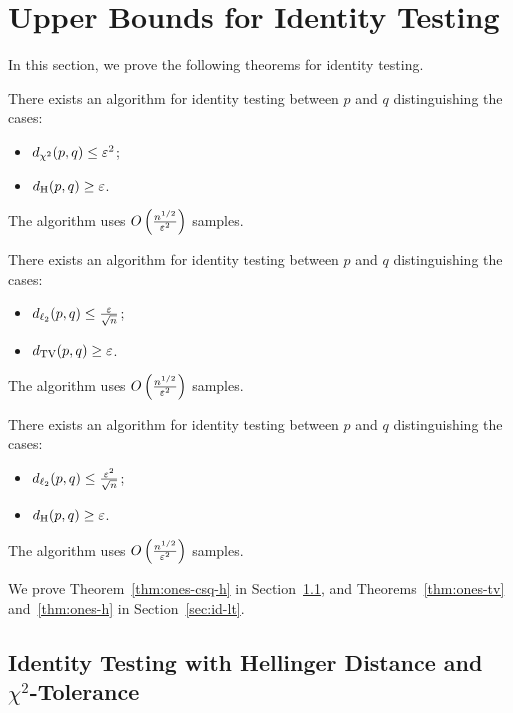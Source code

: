 \section{Upper Bounds for Identity Testing}
\label{sec:ones-ub}
In this section, we prove the following theorems for identity testing.
\begin{theorem}\label{thm:ones-csq-h}
There exists an algorithm for identity testing between $p$ and $q$ distinguishing the cases:
\begin{itemize}
\item $d_{\chi^2}(p,q) \leq \varepsilon^2$;
\item $d_{\mathrm {H}}(p,q) \geq \varepsilon$.
\end{itemize}
The algorithm uses $O\left(\frac{n^{1/2}}{\varepsilon^2}\right)$ samples.
\end{theorem}

\begin{theorem}\label{thm:ones-tv}
There exists an algorithm for identity testing between $p$ and $q$ distinguishing the cases:
\begin{itemize}
\item $d_{\ell_2}(p,q) \leq \frac{\varepsilon}{\sqrt{n}}$;
\item $d_{\mathrm {TV}}(p,q) \geq \varepsilon$.
\end{itemize}
The algorithm uses $O\left(\frac{n^{1/2}}{\varepsilon^2}\right)$ samples.
\end{theorem}

\begin{theorem}\label{thm:ones-h}
There exists an algorithm for identity testing between $p$ and $q$ distinguishing the cases:
\begin{itemize}
\item $d_{\ell_2}(p,q) \leq \frac{\varepsilon^2}{\sqrt{n}}$;
\item $d_{\mathrm {H}}(p,q) \geq \varepsilon$.
\end{itemize}
The algorithm uses $O\left(\frac{n^{1/2}}{\varepsilon^2}\right)$ samples.
\end{theorem}

We prove Theorem~\ref{thm:ones-csq-h} in Section~\ref{sec:id-csq-h}, and Theorems~\ref{thm:ones-tv} and~\ref{thm:ones-h} in Section~\ref{sec:id-lt}.

\subsection{Identity Testing with Hellinger Distance and $\chi^2$-Tolerance}
\label{sec:id-csq-h}

